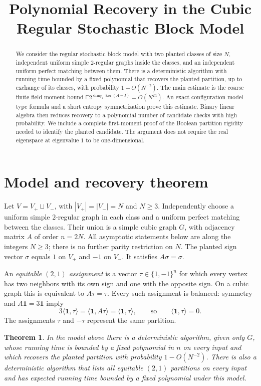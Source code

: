 \documentclass[11pt]{article}
\title{Polynomial Recovery in the Cubic Regular Stochastic Block Model}
\author{}
\date{}
\newtheorem{theorem}{Theorem}
\theoremstyle{remark}
\newcommand{\F}{\mathbb F}
\newcommand{\E}{\mathbb E}
\newcommand{\1}{\mathbf 1}
\begin{document}
\maketitle

\begin{abstract}
We consider the regular stochastic block model with two planted classes
of size $N$, independent uniform simple $2$-regular graphs inside the
classes, and an independent uniform perfect matching between them.
There is a deterministic algorithm with running time bounded by a fixed
polynomial that recovers the planted partition, up to exchange of its
classes, with probability $1-O(N^{-2})$. The main estimate is the coarse
finite-field moment bound
$\E 2^{\dim_{\F_2}\ker(A-I)}=O(N^{24})$.
An exact configuration-model type formula and a short entropy
symmetrization prove this estimate. Binary linear algebra then reduces
recovery to a polynomial number of candidate checks with high probability.
We include a complete first-moment proof of the Boolean partition
rigidity needed to identify the planted candidate. The argument does
not require the real eigenspace at eigenvalue $1$ to be one-dimensional.
\end{abstract}

\section{Model and recovery theorem}

Let $V=V_+\sqcup V_-$, with $|V_+|=|V_-|=N$ and $N\geq3$.
Independently choose a uniform simple $2$-regular graph in each class
and a uniform perfect matching between the classes. Their union is a
simple cubic graph $G$, with adjacency matrix $A$ of order $n=2N$.
All asymptotic statements below are along the integers $N\geq3$; there
is no further parity restriction on $N$.
The planted sign vector $\sigma$ equals $1$ on $V_+$ and $-1$ on $V_-$.
It satisfies $A\sigma=\sigma$.

An \emph{equitable $(2,1)$ assignment} is a vector
$\tau\in\{1,-1\}^{n}$ for which every vertex has two neighbors with
its own sign and one with the opposite sign. On a cubic graph this is
equivalent to $A\tau=\tau$. Every such assignment is balanced:
symmetry and $A\1=3\1$ imply
\[
 3\langle\1,\tau\rangle
 =\langle\1,A\tau\rangle=\langle\1,\tau\rangle,
 \qquad\text{so}\qquad \langle\1,\tau\rangle=0.
\]
The assignments $\tau$ and $-\tau$ represent the same partition.

\begin{theorem}\label{thm:main}
In the model above there is a deterministic algorithm, given only $G$,
whose running time is bounded by a fixed polynomial in $n$ on every
input and which recovers the planted partition with probability
$1-O(N^{-2})$.
There is also a deterministic algorithm that lists all equitable
$(2,1)$ partitions on every input and has expected running time
bounded by a fixed polynomial under this model.
\end{theorem}
\end{document}

